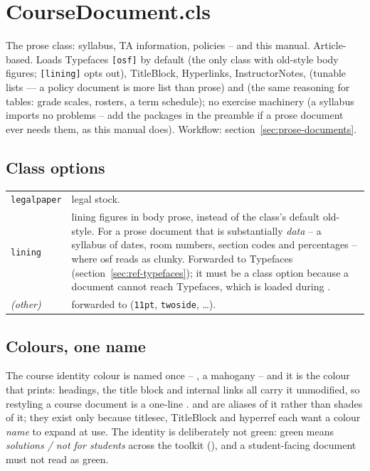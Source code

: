 \section{CourseDocument.cls}\label{sec:ref-coursedocument}

The prose class: syllabus, TA information, policies -- and this manual.
Article-based. Loads Typefaces \texttt{[osf]} by default (the only class
with old-style body figures; \texttt{[lining]} opts out), TitleBlock,
Hyperlinks, InstructorNotes,  (tunable lists --- a policy
document is more list than prose) and  (the same reasoning
for tables: grade scales, rosters, a term schedule); no
exercise machinery (a syllabus imports no problems -- add the packages in
the preamble if a prose document ever needs them, as this manual does).
Workflow: section~\ref{sec:prose-documents}.

\subsection*{Class options}

\begin{center}
\begin{tabularx}{\linewidth}{@{}l Y@{}}
\texttt{legalpaper} & legal stock.\\
\texttt{lining} & lining figures in body prose, instead of the class's
  default old-style. For a prose document that is substantially
  \emph{data} -- a syllabus of dates, room numbers, section codes and
  percentages -- where osf reads as clunky. Forwarded to Typefaces
  (section~\ref{sec:ref-typefaces}); it must be a class option because a
  document cannot reach Typefaces, which is loaded during
  .\\
\emph{(other)} & forwarded to  (\texttt{11pt},
  \texttt{twoside}, \dots).\\
\end{tabularx}
\end{center}

\subsection*{Colours, one name}

The course identity colour is named once -- , a
mahogany -- and it is the colour that prints: headings, the title block
and internal links all carry it unmodified, so restyling a course
document is a one-line .  and
 are aliases of it rather than shades of it; they exist
only because titlesec, TitleBlock and hyperref each want a colour \emph{name}
to expand at use. The identity is deliberately not green: green means
\emph{solutions / not for students} across the toolkit
(), and a student-facing document must not read as
green.

